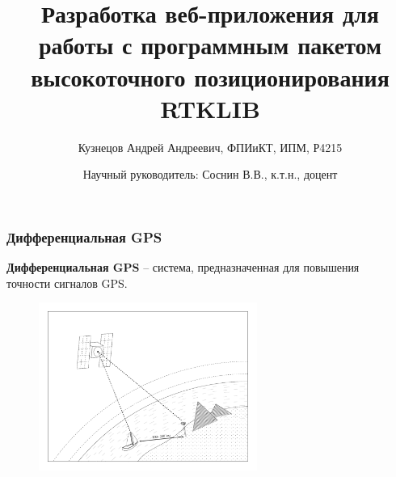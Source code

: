 \documentclass[xetex,с,aspectratio=169]{beamer}
\title{Разработка веб-приложения для работы с программным пакетом высокоточного позиционирования RTKLIB}
\author[Кузнецов А.А., P3410]{Кузнецов Андрей Андреевич, ФПИиКТ, ИПМ, Р4215}
\date[]{Научный руководитель: Соснин В.В., к.т.н., доцент}
\begin{document}
%
%
\begin{frame}
  \titlepage
\end{frame}


%
%
\begin{frame}
  \frametitle{Дифференциальная GPS}

  \begin{center}
    \textbf{Дифференциальная GPS} -- система, предназначенная для повышения\\точности сигналов GPS.
  \end{center}

  \vskip -0.25cm

  \begin{figure}[h]
    \centering
    \includegraphics[height=5.5cm]{../img/tikz/dgps-one/pic}
  \end{figure}
\end{frame}
\end{document}
